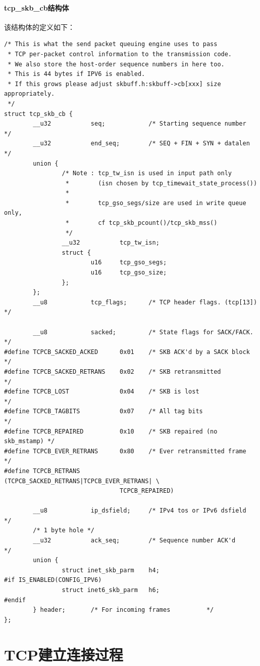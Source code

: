 \documentclass[11pt, a4paper,oneside]{book}
\theoremstyle{ocrenumbox}
\theoremstyle{purplenumbox}
\theoremstyle{blackbox}
\begin{document}
			\subsubsection{tcp\_skb\_cb结构体}
\label{subsec:tcp_skb_sb_structure}
该结构体的定义如下：
\begin{verbatim}
/* This is what the send packet queuing engine uses to pass
 * TCP per-packet control information to the transmission code.
 * We also store the host-order sequence numbers in here too.
 * This is 44 bytes if IPV6 is enabled.
 * If this grows please adjust skbuff.h:skbuff->cb[xxx] size appropriately.
 */
struct tcp_skb_cb {
        __u32           seq;            /* Starting sequence number     */
        __u32           end_seq;        /* SEQ + FIN + SYN + datalen    */
        union {
                /* Note : tcp_tw_isn is used in input path only
                 *        (isn chosen by tcp_timewait_state_process())
                 *
                 *        tcp_gso_segs/size are used in write queue only,
                 *        cf tcp_skb_pcount()/tcp_skb_mss()
                 */
                __u32           tcp_tw_isn;
                struct {
                        u16     tcp_gso_segs;
                        u16     tcp_gso_size;
                };
        };
        __u8            tcp_flags;      /* TCP header flags. (tcp[13])  */

        __u8            sacked;         /* State flags for SACK/FACK.   */
#define TCPCB_SACKED_ACKED      0x01    /* SKB ACK'd by a SACK block    */
#define TCPCB_SACKED_RETRANS    0x02    /* SKB retransmitted            */
#define TCPCB_LOST              0x04    /* SKB is lost                  */
#define TCPCB_TAGBITS           0x07    /* All tag bits                 */
#define TCPCB_REPAIRED          0x10    /* SKB repaired (no skb_mstamp) */
#define TCPCB_EVER_RETRANS      0x80    /* Ever retransmitted frame     */
#define TCPCB_RETRANS           (TCPCB_SACKED_RETRANS|TCPCB_EVER_RETRANS| \
                                TCPCB_REPAIRED)

        __u8            ip_dsfield;     /* IPv4 tos or IPv6 dsfield     */
        /* 1 byte hole */
        __u32           ack_seq;        /* Sequence number ACK'd        */
        union {
                struct inet_skb_parm    h4;
#if IS_ENABLED(CONFIG_IPV6)
                struct inet6_skb_parm   h6;
#endif
        } header;       /* For incoming frames          */
};
\end{verbatim}


\chapter{TCP建立连接过程}
\end{document}
